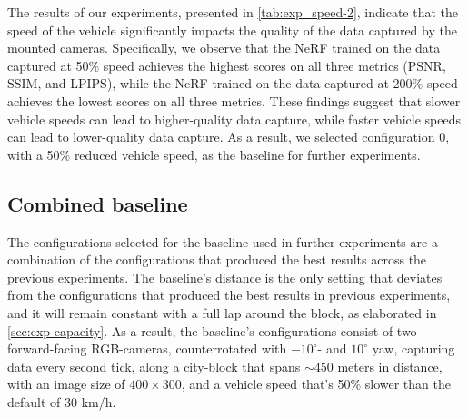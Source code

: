 The results of our experiments, presented in \autoref{tab:exp_speed-2}, indicate that the speed of the vehicle significantly impacts the quality of the data captured by the mounted cameras. Specifically, we observe that the NeRF trained on the data captured at 50\% speed achieves the highest scores on all three metrics (PSNR, SSIM, and LPIPS), while the NeRF trained on the data captured at 200\% speed achieves the lowest scores on all three metrics. These findings suggest that slower vehicle speeds can lead to higher-quality data capture, while faster vehicle speeds can lead to lower-quality data capture. As a result, we selected configuration 0, with a 50\% reduced vehicle speed, as the baseline for further experiments.
















\subsection{Combined baseline}
The configurations selected for the baseline used in further experiments are a combination of the configurations that produced the best results across the previous experiments. The baseline’s distance is the only setting that deviates from the configurations that produced the best results in previous experiments, and it will remain constant with a full lap around the block, as elaborated in \autoref{sec:exp-capacity}. As a result, the baseline's configurations consist of two forward-facing RGB-cameras, counterrotated with $-10^\circ$- and $10^\circ$ yaw, capturing data every second tick, along a city-block that spans $\sim450$ meters in distance, with an image size of $400 \times 300$, and a vehicle speed that's 50\% slower than the default of 30 km/h. 

